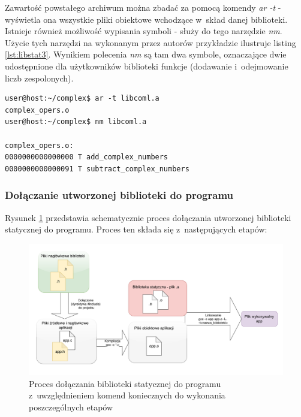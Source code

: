 Zawartość powstałego archiwum można zbadać za pomocą komendy \textit{ar -t} - wyświetla ona wszystkie pliki obiektowe wchodzące w~skład danej biblioteki. Istnieje również możliwość wypisania symboli - służy do tego narzędzie \textit{nm}. Użycie tych narzędzi na wykonanym przez autorów przykładzie ilustruje listing \ref{lst:libstat3}. Wynikiem polecenia \textit{nm} są tam dwa symbole, oznaczające dwie udostępnione dla użytkowników biblioteki funkcje (dodawanie i~odejmowanie liczb zespolonych).

\begin{lstlisting}[language=Cmd, caption={Użycie poleceń \textit{ar -t} oraz \textit{nm} na bibliotece statycznej.},label={lst:libstat3}]
user@host:~/complex$ ar -t libcoml.a
complex_opers.o
user@host:~/complex$ nm libcoml.a

complex_opers.o:
0000000000000000 T add_complex_numbers
0000000000000091 T subtract_complex_numbers
\end{lstlisting}

\newpage
\subsubsection*{Dołączanie utworzonej biblioteki do programu}
Rysunek \ref{fig:staticliblink} przedstawia schematycznie proces dołączania utworzonej biblioteki statycznej do programu. Proces ten składa się z~następujących etapów:

\begin{figure}[H]
\centering
\caption{Proces dołączania biblioteki statycznej do programu z~uwzględnieniem komend koniecznych do wykonania poszczególnych etapów \cite{Compiling}}
\label{fig:staticliblink}
\includegraphics[width=\textwidth]{res/StaticLibLink}
\end{figure}

